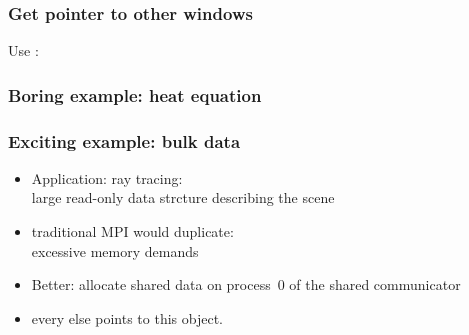 \begin{frame}[containsverbatim]\frametitle{Get pointer to other windows}
  Use :
\end{frame}

\begin{frame}[containsverbatim]\frametitle{Boring example: heat equation}
\end{frame}

\begin{frame}[containsverbatim]\frametitle{Exciting example: bulk data}
  \begin{itemize}
  \item Application: ray tracing:\\
    large read-only data strcture describing the scene
  \item traditional MPI would duplicate:\\
    excessive memory demands
  \item Better: allocate shared data on process~0 of the shared communicator
  \item every else points to this object.
  \end{itemize}
\end{frame}

\begin{exerciseframe}[shareddata]
    
\end{exerciseframe}

\endinput

\begin{frame}[containsverbatim]\frametitle{}
\begin{lstlisting}
  
\end{lstlisting}
\end{frame}

